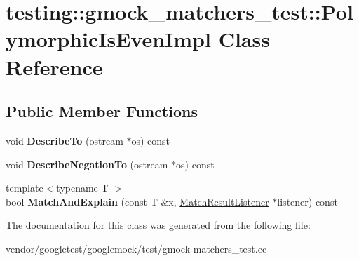 \hypertarget{classtesting_1_1gmock__matchers__test_1_1_polymorphic_is_even_impl}{}\section{testing\+:\+:gmock\+\_\+matchers\+\_\+test\+:\+:Polymorphic\+Is\+Even\+Impl Class Reference}
\label{classtesting_1_1gmock__matchers__test_1_1_polymorphic_is_even_impl}
\subsection*{Public Member Functions}
\begin{DoxyCompactItemize}
\item 
\mbox{\label{classtesting_1_1gmock__matchers__test_1_1_polymorphic_is_even_impl_ac07eb9f72db98b4b5489a139e844394c}} 
void {\bfseries Describe\+To} (ostream $\ast$os) const
\item 
\mbox{\label{classtesting_1_1gmock__matchers__test_1_1_polymorphic_is_even_impl_a2e873630451f3cf6cad5bf6f82e00a33}} 
void {\bfseries Describe\+Negation\+To} (ostream $\ast$os) const
\item 
\mbox{\label{classtesting_1_1gmock__matchers__test_1_1_polymorphic_is_even_impl_ab8d500c4d6c57645527fc367acf6189e}} 
{\footnotesize template$<$typename T $>$ }\\bool {\bfseries Match\+And\+Explain} (const T \&x, \hyperlink{classtesting_1_1_match_result_listener}{Match\+Result\+Listener} $\ast$listener) const
\end{DoxyCompactItemize}


The documentation for this class was generated from the following file\+:\begin{DoxyCompactItemize}
\item 
vendor/googletest/googlemock/test/gmock-\/matchers\+\_\+test.\+cc\end{DoxyCompactItemize}
